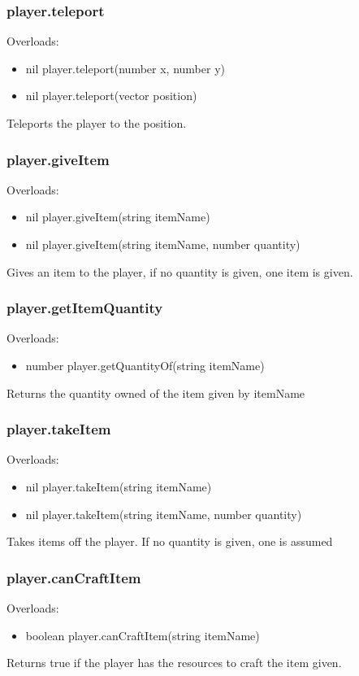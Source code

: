 \documentclass{book}
\newenvironment{ulist}
	{\begin{itemize}
			\itemsep0em}
	{\end{itemize}}
\begin{document}
\subsubsection{player.teleport}
Overloads:
\begin{ulist}
	\item nil player.teleport(number x, number y)
	\item nil player.teleport(vector position)
\end{ulist}
Teleports the player to the position.

\subsubsection{player.giveItem}
Overloads:
\begin{ulist}
	\item nil player.giveItem(string itemName)
	\item nil player.giveItem(string itemName, number quantity)
\end{ulist}
Gives an item to the player, if no quantity is given, one item is given.

\subsubsection{player.getItemQuantity}
Overloads:
\begin{ulist}
	\item number player.getQuantityOf(string itemName)
\end{ulist}
Returns the quantity owned of the item given by itemName

\subsubsection{player.takeItem}
Overloads:
\begin{ulist}
	\item nil player.takeItem(string itemName)
	\item nil player.takeItem(string itemName, number quantity)
\end{ulist}
Takes items off the player. If no quantity is given, one is assumed

\subsubsection{player.canCraftItem}
Overloads:
\begin{ulist}
	\item boolean player.canCraftItem(string itemName)
\end{ulist}
Returns true if the player has the resources to craft the item given.
\end{document}
